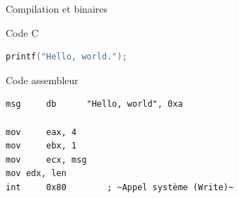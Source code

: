 \documentclass{beamer}
\begin{document}
\begin{frame}[fragile]{Compilation et binaires}
\begin{block}{Code C}
\begin{lstlisting}[language={C}, style=verbo,aboveskip=0pt,belowskip=0pt]
printf("Hello, world.");
\end{lstlisting}
\end{block}
\pause

\begin{center}
\end{center}
\pause

\begin{block}{Code assembleur}
\begin{lstlisting}[language={[x86masm]Assembler}, style=verbo, escapechar=~,aboveskip=0pt,belowskip=0pt]
msg     db      "Hello, world", 0xa

mov     eax, 4 
mov     ebx, 1 
mov     ecx, msg 
mov	edx, len 
int     0x80        ; ~Appel système (Write)~
\end{lstlisting}
\end{block}
\end{frame}
\end{document}
